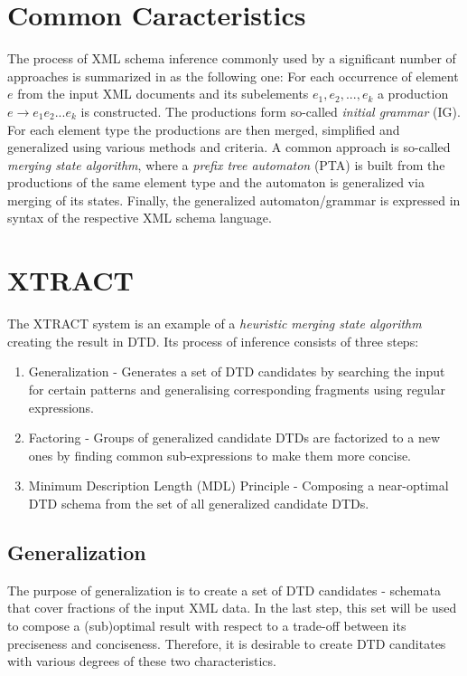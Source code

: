 \section{Common Caracteristics}
The process of XML schema inference commonly used by a significant number of approaches is summarized in \cite{Mlynkova:2008:AAX:1494650.1495496} as the following one: For each occurrence of element $e$ from the input XML documents and its subelements $e_1, e_2, ..., e_k$ a production $e \rightarrow e_1 e_2 ... e_k$ is constructed. The productions form so-called \emph{initial grammar} (IG). For each element type the productions are then merged, simplified and generalized using various methods and criteria. A common approach is so-called \emph{merging state algorithm}, where a \emph{prefix tree automaton} (PTA) is built from the productions of the same element type and the automaton is generalized via merging of its states. Finally, the generalized automaton/grammar is expressed in syntax of the respective XML schema language.

\section{XTRACT} \label{section_xtract}
The XTRACT \cite{Garofalakis:2000:XSE:342009.335409} system is an example of a \emph{heuristic} \emph{merging state algorithm} creating the result in DTD. Its process of inference consists of three steps:
\begin{enumerate}
\item Generalization - Generates a set of DTD candidates by searching the input for certain patterns and generalising corresponding fragments using regular expressions.
\item Factoring - Groups of generalized candidate DTDs are factorized to a new ones by finding common sub-expressions to make them more concise.
\item Minimum Description Length (MDL) Principle - Composing a near-optimal DTD schema from the set of all generalized candidate DTDs.
\end{enumerate}

\subsection{Generalization}
The purpose of generalization is to create a set of DTD candidates - schemata that cover fractions of the input XML data. In the last step, this set will be used to compose a (sub)optimal result with respect to a trade-off between its preciseness and conciseness. Therefore, it is desirable to create DTD canditates with various degrees of these two characteristics.

